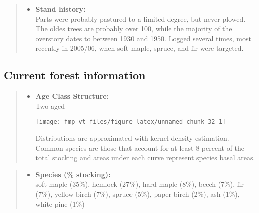 \documentclass[]{tufte-handout}
\providecommand{\tightlist}{%
  \setlength{\itemsep}{0pt}\setlength{\parskip}{0pt}}
\begin{document}
\begin{quote}
\begin{itemize}
\tightlist
\item
  \textbf{Stand history:}\\
  \vspace{2pt} Parts were probably pastured to a limited degree, but
  never plowed. The oldes trees are probably over 100, while the
  majority of the overstory dates to between 1930 and 1950. Logged
  several times, most recently in 2005/06, when soft maple, spruce, and
  fir were targeted.
\end{itemize}
\end{quote}

\subsection{Current forest
information}\label{current-forest-information-6}

\begin{quote}
\begin{itemize}
\tightlist
\item
  \textbf{Age Class Structure:}\\
  \vspace{2pt} Two-aged\\

  \begin{marginfigure}
  \texttt{[image: fmp-vt\_files/figure-latex/unnamed-chunk-32-1]} \caption[Distributions are approximated with kernel density estimation]{Distributions are approximated with kernel density estimation. Common species are those that account for at least 8 percent of the total stocking and areas under each curve represent species basal areas.}\label{fig:unnamed-chunk-32}
  \end{marginfigure}
\end{itemize}
\end{quote}

\begin{quote}
\begin{itemize}
\tightlist
\item
  \textbf{Species (\% stocking):}\\
  \vspace{2pt} soft maple (35\%), hemlock (27\%), hard maple (8\%),
  beech (7\%), fir (7\%), yellow birch (7\%), spruce (5\%), paper birch
  (2\%), ash (1\%), white pine (1\%)
\end{itemize}
\end{quote}
\end{document}
